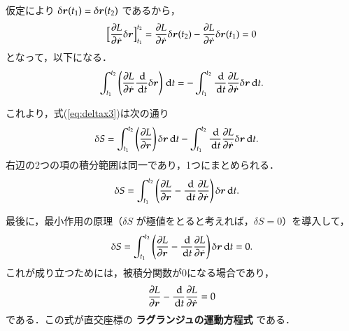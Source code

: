             仮定により $\delta\boldsymbol{r}(t_{1}) =\delta \boldsymbol{r}(t_{2})$ であるから，
                \begin{align*}
                    \Bigl[\frac{\partial L}{\partial\dot{\boldsymbol{r}}}\delta \boldsymbol{r}\Bigr]_{t_{1}}^{t_{2}}
                    = \frac{\partial L}{\partial\dot{\boldsymbol{r}}}\delta \boldsymbol{r}(t_2) - \frac{\partial L}{\partial\dot{\boldsymbol{r}}}\delta \boldsymbol{r}(t_{1})
                    = 0
                \end{align*}
            となって，以下になる．
                                \begin{align*}
                                        \int_{t_{1}}^{t_{2}}\left( \frac{\partial L}{\partial \dot{\boldsymbol{r}}}\frac{\,\mathrm{d} }{\,\mathrm{d} t}\delta \boldsymbol{r} \right) \,\mathrm{d} t
                    = -\int_{t_{1}}^{t_{2}}\frac{\,\mathrm{d} }{\,\mathrm{d} t} \frac{\partial L}{\partial \dot{\boldsymbol{r}}} \delta \boldsymbol{r}\,\mathrm{d} t.
                                \end{align*}

                        これより，式(\ref{eq:deltax3})は次の通り
                \begin{align}
                    \delta S&=\int_{t_{1}}^{t_{2}}\left(
                    \frac{\partial L}{\partial \boldsymbol{r}}\right) \delta \boldsymbol{r}\,\mathrm{d} t
                    -\int_{t_{1}}^{t_{2}}\frac{\,\mathrm{d} }{\,\mathrm{d} t} \frac{\partial L}{\partial \dot{\boldsymbol{r}}}
                    \delta \boldsymbol{r}\,\mathrm{d} t.
                \end{align}
                        右辺の2つの項の積分範囲は同一であり，1つにまとめられる．
                \begin{align}
                    \delta S&=\int_{t_{1}}^{t_{2}}\left(
                    \frac{\partial L}{\partial \boldsymbol{r}}
                    -\frac{\,\mathrm{d} }{\,\mathrm{d} t} \frac{\partial L}{\partial \dot{\boldsymbol{r}}}
                    \right)\delta \boldsymbol{r}\,\mathrm{d} t.
                \end{align}

            最後に，最小作用の原理（$\delta S$ が極値をとると考えれば，$\delta S=0$）を導入して，
                \begin{align*}
                    \delta S = \int_{t_{1}}^{t_{2}}\left(
                                                 \frac{\partial L}{\partial \boldsymbol{r}}
                                                -\frac{\,\mathrm{d} }{\,\mathrm{d} t} \frac{\partial L}{\partial \dot{\boldsymbol{r}}}
                                            \right)\delta \boldsymbol{r}\,\mathrm{d} t
                                         = 0.
                \end{align*}
            これが成り立つためには，被積分関数が0になる場合であり，
                \begin{align}
                    \frac{\partial L}{\partial \boldsymbol{r}} -\frac{\,\mathrm{d} }{\,\mathrm{d} t} \frac{\partial L}{\partial \dot{\boldsymbol{r}}}=0
                \end{align}
            である．この式が直交座標の \textbf{ラグランジュの運動方程式} である．

